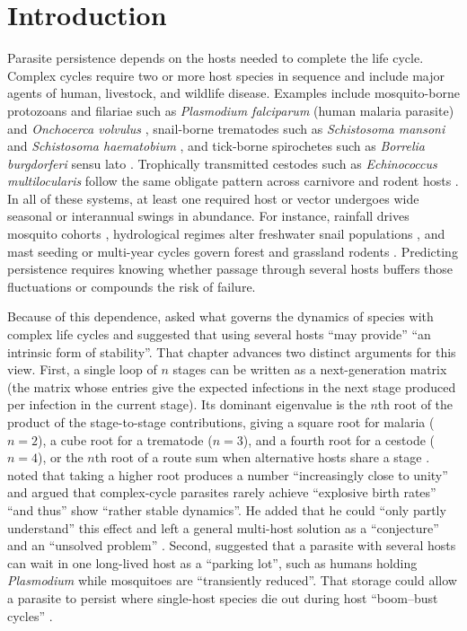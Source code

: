 \section{Introduction}\label{sec:intro}

Parasite persistence depends on the hosts needed to complete the life cycle. Complex cycles require two or more host species in sequence and include major agents of human, livestock, and wildlife disease. Examples include mosquito-borne protozoans and filariae such as \textit{Plasmodium falciparum} (human malaria parasite) and \textit{Onchocerca volvulus} \citep{smith2007,basanez2009}, snail-borne trematodes such as \textit{Schistosoma mansoni} and \textit{Schistosoma haematobium} \citep{colley2014,anderson2015}, and tick-borne spirochetes such as \textit{Borrelia burgdorferi} sensu lato \citep{dunn2013,tufts2021}. Trophically transmitted cestodes such as \textit{Echinococcus multilocularis} follow the same obligate pattern across carnivore and rodent hosts \citep{ishikawa2003,atkinson2013}. In all of these systems, at least one required host or vector undergoes wide seasonal or interannual swings in abundance. For instance, rainfall drives mosquito cohorts \citep{ndiath2012,ototo2015,whittaker2022}, hydrological regimes alter freshwater snail populations \citep{rabone2019,anderson2021}, and mast seeding or multi-year cycles govern forest and grassland rodents \citep{elias2004,lambin2006,jacob2011}. Predicting persistence requires knowing whether passage through several hosts buffers those fluctuations or compounds the risk of failure.

Because of this dependence, \citet{dobson2020} asked what governs the dynamics of species with complex life cycles and suggested that using several hosts ``may provide'' ``an intrinsic form of stability''. That chapter advances two distinct arguments for this view. First, a single loop of $n$ stages can be written as a next-generation matrix (the matrix whose entries give the expected infections in the next stage produced per infection in the current stage). Its dominant eigenvalue is the $n$th root of the product of the stage-to-stage contributions, giving a square root for malaria ($n = 2$), a cube root for a trematode ($n = 3$), and a fourth root for a cestode ($n = 4$), or the $n$th root of a route sum when alternative hosts share a stage \citep{dobson2020}. \citet{dobson2020} noted that taking a higher root produces a number ``increasingly close to unity'' and argued that complex-cycle parasites rarely achieve ``explosive birth rates'' ``and thus'' show ``rather stable dynamics''. He added that he could ``only partly understand'' this effect and left a general multi-host solution as a ``conjecture'' and an ``unsolved problem'' \citep{dobson2020}. Second, \citet{dobson2020} suggested that a parasite with several hosts can wait in one long-lived host as a ``parking lot'', such as humans holding \textit{Plasmodium} while mosquitoes are ``transiently reduced''. That storage could allow a parasite to persist where single-host species die out during host ``boom--bust cycles'' \citep{dobson2020}.

